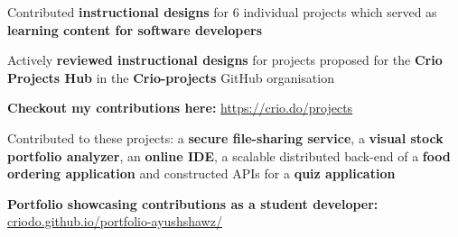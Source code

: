 \documentclass[]{deedy-resume-openfont}
\begin{document}
\begin{minipage}[t]{0.66\textwidth}
\begin{tightemize}
\item Contributed \textbf{instructional designs} for 6 individual projects which served as \textbf{learning content for software developers}
\item Actively \textbf{reviewed instructional designs} for projects proposed for the \textbf{Crio Projects Hub} in the \textbf{Crio-projects} GitHub organisation
\item \textbf{Checkout my contributions here:} \href{https://crio.do/projects}{https://crio.do/projects}
\end{tightemize}

\begin{tightemize}
\item Contributed to these projects: a \textbf{secure file-sharing service}, a \textbf{visual stock portfolio analyzer}, an \textbf{online IDE}, a scalable distributed back-end of a \textbf{food ordering application} and constructed APIs for a \textbf{quiz application}\\
\end{tightemize}



\setlength\parindent{24pt} \textbf{Portfolio showcasing contributions as a student developer:} \\ 
\href{https://criodo.github.io/portfolio-ayushshawz/}{criodo.github.io/portfolio-ayushshawz/}\\
\setlength\parindent{0pt}


\end{minipage}
\end{document}
